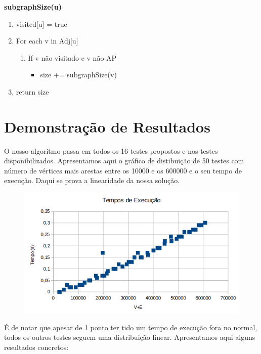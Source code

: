 \documentclass[12pt]{article}
\begin{document}
    \vspace{1em}

    \textbf{subgraphSize(u)}
    \begin{enumerate}
        \setlength\itemsep{0.2em}
        \item visited[u] = true
        \item For each v in Adj[u]
        \begin{enumerate}
            \setlength\itemsep{0.2em}
            \item If v não visitado e v não AP
            \begin{itemize}
                \setlength\itemsep{0.2em}
                \item size += subgraphSize(v)
            \end{itemize}
        \end{enumerate}
        \item return size
    \end{enumerate}



\section{Demonstração de Resultados}
O nosso algoritmo passa em todos os 16 testes propostos e nos testes disponibilizados. Apresentamos aqui o gráfico de distibuição de 50 testes com número de vértices mais arestas entre
os 10000 e os 600000 e o seu tempo de execução. Daqui se prova a linearidade da nossa solução.

\begin{figure}[h]
\includegraphics[scale=0.5]{images/VandEGraph}
\centering
\end{figure}

É de notar que apesar de 1 ponto ter tido um tempo de execução fora no normal, todos os outros testes seguem uma distribuição linear.
Apresentamos aqui alguns resultados concretos:
\par
\end{document}
